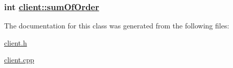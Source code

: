 \hypertarget{classclient_89b86d03136dc2f044d7669137baf6b5}{
\subsubsection[sumOfOrder]{\setlength{\rightskip}{0pt plus 5cm}int \hyperlink{classclient_89b86d03136dc2f044d7669137baf6b5}{client::sum\-Of\-Order}}}
\label{classclient_89b86d03136dc2f044d7669137baf6b5}




The documentation for this class was generated from the following files:\begin{CompactItemize}
\item 
\hyperlink{client_8h}{client.h}\item 
\hyperlink{client_8cpp}{client.cpp}\end{CompactItemize}
